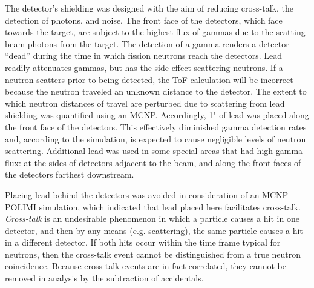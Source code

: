 The detector's shielding was designed with the aim of reducing cross-talk, the detection of photons, and noise.
The front face of the detectors, which face towards the target, are subject to the highest flux of gammas due to the scatting beam photons from the target.
The detection of a gamma renders a detector ``dead'' during the time in which fission neutrons reach the detectors.
Lead readily attenuates gammas, but has the side effect scattering neutrons.
If a neutron scatters prior to being detected, the ToF calculation will be incorrect because the neutron traveled an unknown distance to the detector.
The extent to which neutron distances of travel are perturbed due to scattering from lead shielding was quantified using an MCNP.
Accordingly, 1" of lead was placed along the front face of the detectors.
This effectively diminished gamma detection rates and, according to the simulation, is expected to cause negligible levels of neutron scattering.
Additional lead was used in some special areas that had high gamma flux: at the sides of detectors adjacent to the beam, and along the front faces of the detectors farthest downstream.

Placing lead behind the detectors was avoided in consideration of an MCNP-POLIMI simulation, which indicated that lead placed here facilitates cross-talk. \textit{Cross-talk} is an undesirable phenomenon in which a particle causes a hit in one detector, and then by any means (e.g. scattering), the same particle causes a hit in a different detector.
If both hits occur within the time frame typical for neutrons, then the cross-talk event cannot be distinguished from a true neutron coincidence.
Because cross-talk events are in fact correlated, they cannot be removed in analysis by the subtraction of accidentals.

